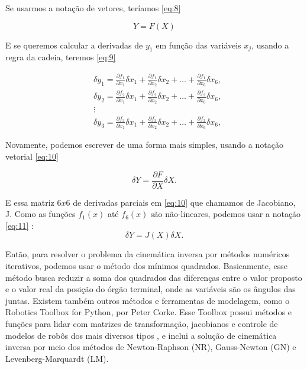 Se usarmos a notação de vetores, teríamos \eqref{eq:8}

\begin{equation}
	Y = F(X)
	\label{eq:8}
\end{equation}

E se queremos calcular a derivadas de $y_1$ em função das variáveis $x_j$, usando a regra da cadeia, teremos \eqref{eq:9}

\begin{align}
	&\delta y_1 = \frac{\partial f_1}{\partial x_1} \delta x_1 + \frac{\partial f_1}{\partial x_2} \delta x_2 + \ldots + \frac{\partial f_1}{\partial x_6} \delta x_6, \nonumber\\
	&\delta y_2 = \frac{\partial f_2}{\partial x_1} \delta x_1 + \frac{\partial f_2}{\partial x_2} \delta x_2 + \ldots + \frac{\partial f_2}{\partial x_6} \delta x_6, \nonumber\\
	&\vdots \nonumber\\
	&\delta y_3 = \frac{\partial f_3}{\partial x_1} \delta x_1 + \frac{\partial f_3}{\partial x_2} \delta x_2 + \ldots + \frac{\partial f_3}{\partial x_6} \delta x_6,
	\label{eq:9}
\end{align}

Novamente, podemos escrever de uma forma mais simples, usando a notação vetorial \eqref{eq:10}

\begin{equation}
	\delta Y = \frac{\partial F}{\partial X} \delta X.
	\label{eq:10}
\end{equation}

E essa matriz $6x6$ de derivadas parciais em \eqref{eq:10} que chamamos de Jacobiano, J. Como as funções $f_1(x)$ até $f_6(x)$ são não-lineares, podemos usar a notação \eqref{eq:11} \cite{Craig2005}:
\begin{equation}
	\label{eq:11}
	\delta Y = J(X)\delta X.
\end{equation}

Então, para resolver o problema da cinemática inversa por métodos numéricos
iterativos, podemos usar o método dos mínimos quadrados. Basicamente, esse método busca
reduzir a soma dos quadrados das diferenças entre o valor proposto e o valor real da posição
do órgão terminal, onde as variáveis são os ângulos das juntas. Existem também outros métodos e ferramentas de modelagem, como o Robotics Toolbox for Python, por Peter Corke. Esse Toolbox possui métodos e funções para lidar com matrizes de transformação, jacobianos e controle de modelos de robôs dos mais diversos tipos \cite{rtb2021}, e inclui a solução de cinemática inversa por meio dos métodos de Newton-Raphson (NR),  Gauss-Newton (GN) e Levenberg-Marquardt (LM).

